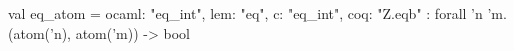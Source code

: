 val eq_atom = {ocaml: "eq_int", lem: "eq", c: "eq_int", coq: "Z.eqb"} : forall 'n 'm. (atom('n), atom('m)) -> bool
